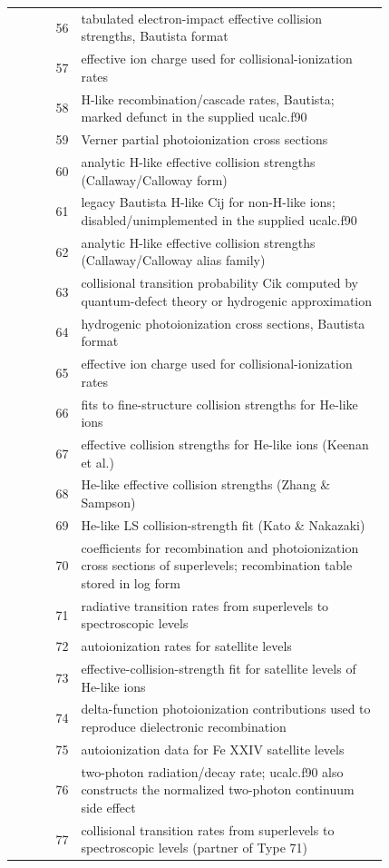 \documentclass[
  10pt,
]{article}
\begin{document}
\begin{longtable}[]{@{}r p{0.82\linewidth}@{}}
56 & tabulated electron-impact effective collision strengths, Bautista format \\
57 & effective ion charge used for collisional-ionization rates \\
58 & H-like recombination/cascade rates, Bautista; marked defunct in the supplied ucalc.f90 \\
59 & Verner partial photoionization cross sections \\
60 & analytic H-like effective collision strengths (Callaway/Calloway form) \\
61 & legacy Bautista H-like Cij for non-H-like ions; disabled/unimplemented in the supplied ucalc.f90 \\
62 & analytic H-like effective collision strengths (Callaway/Calloway alias family) \\
63 & collisional transition probability Cik computed by quantum-defect theory or hydrogenic approximation \\
64 & hydrogenic photoionization cross sections, Bautista format \\
65 & effective ion charge used for collisional-ionization rates \\
66 & fits to fine-structure collision strengths for He-like ions \\
67 & effective collision strengths for He-like ions (Keenan et al.) \\
68 & He-like effective collision strengths (Zhang \& Sampson) \\
69 & He-like LS collision-strength fit (Kato \& Nakazaki) \\
70 & coefficients for recombination and photoionization cross sections of superlevels; recombination table stored in log form \\
71 & radiative transition rates from superlevels to spectroscopic levels \\
72 & autoionization rates for satellite levels \\
73 & effective-collision-strength fit for satellite levels of He-like ions \\
74 & delta-function photoionization contributions used to reproduce dielectronic recombination \\
75 & autoionization data for Fe XXIV satellite levels \\
76 & two-photon radiation/decay rate; ucalc.f90 also constructs the normalized two-photon continuum side effect \\
77 & collisional transition rates from superlevels to spectroscopic levels (partner of Type 71) \\

\end{longtable}
\end{document}
